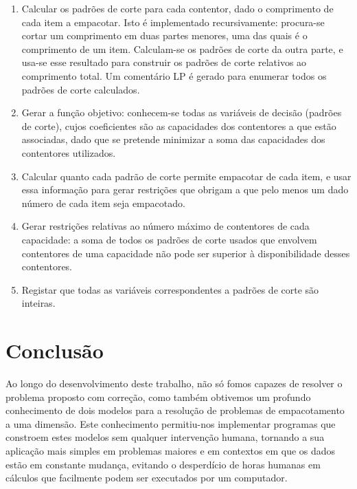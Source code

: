 \documentclass[12pt, a4paper, titlepage]{article}
\begin{document}
\begin{enumerate}
    \item Calcular os padrões de corte para cada contentor, dado o comprimento de cada item a
        empacotar. Isto é implementado recursivamente: procura-se cortar um comprimento em duas
        partes menores, uma das quais é o comprimento de um item. Calculam-se os padrões de corte da
        outra parte, e usa-se esse resultado para construir os padrões de corte relativos ao
        comprimento total. Um comentário LP é gerado para enumerar todos os padrões de corte
        calculados.

    \item Gerar a função objetivo: conhecem-se todas as variáveis de decisão (padrões de corte),
        cujos coeficientes são as capacidades dos contentores a que estão associadas, dado que se
        pretende minimizar a soma das capacidades dos contentores utilizados.

    \item Calcular quanto cada padrão de corte permite empacotar de cada item, e usar essa
        informação para gerar restrições que obrigam a que pelo menos um dado número de cada item
        seja empacotado.

    \item Gerar restrições relativas ao número máximo de contentores de cada capacidade: a soma de
        todos os padrões de corte usados que envolvem contentores de uma capacidade não pode ser
        superior à disponibilidade desses contentores.

    \item Registar que todas as variáveis correspondentes a padrões de corte são inteiras.
\end{enumerate}

\section{Conclusão}

Ao longo do desenvolvimento deste trabalho, não só fomos capazes de resolver o problema proposto
com correção, como também obtivemos um profundo conhecimento de dois modelos para a resolução de
problemas de empacotamento a uma dimensão. Este conhecimento permitiu-nos implementar programas que
constroem estes modelos sem qualquer intervenção humana, tornando a sua aplicação mais simples em
problemas maiores e em contextos em que os dados estão em constante mudança, evitando o desperdício
de horas humanas em cálculos que facilmente podem ser executados por um computador.
\end{document}
